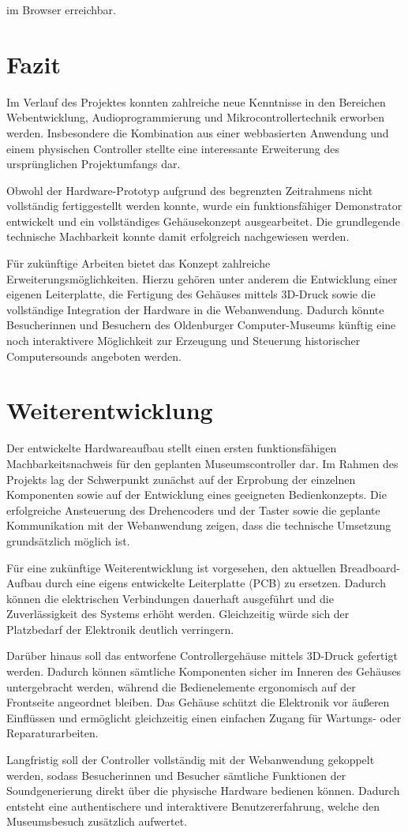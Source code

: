 im Browser erreichbar.

\section{Fazit}

Im Verlauf des Projektes konnten zahlreiche neue Kenntnisse in den Bereichen
Webentwicklung, Audioprogrammierung und Mikrocontrollertechnik erworben werden.
Insbesondere die Kombination aus einer webbasierten Anwendung und einem physischen
Controller stellte eine interessante Erweiterung des ursprünglichen Projektumfangs dar.

Obwohl der Hardware-Prototyp aufgrund des begrenzten Zeitrahmens nicht vollständig
fertiggestellt werden konnte, wurde ein funktionsfähiger Demonstrator entwickelt und ein
vollständiges Gehäusekonzept ausgearbeitet. Die grundlegende technische Machbarkeit
konnte damit erfolgreich nachgewiesen werden.

Für zukünftige Arbeiten bietet das Konzept zahlreiche Erweiterungsmöglichkeiten.
Hierzu gehören unter anderem die Entwicklung einer eigenen Leiterplatte, die Fertigung
des Gehäuses mittels 3D-Druck sowie die vollständige Integration der Hardware in die
Webanwendung. Dadurch könnte Besucherinnen und Besuchern des Oldenburger
Computer-Museums künftig eine noch interaktivere Möglichkeit zur Erzeugung und
Steuerung historischer Computersounds angeboten werden.

\section{Weiterentwicklung}

Der entwickelte Hardwareaufbau stellt einen ersten funktionsfähigen
Machbarkeitsnachweis für den geplanten Museumscontroller dar. Im Rahmen des
Projekts lag der Schwerpunkt zunächst auf der Erprobung der einzelnen Komponenten
sowie auf der Entwicklung eines geeigneten Bedienkonzepts. Die erfolgreiche
Ansteuerung des Drehencoders und der Taster sowie die geplante Kommunikation mit
der Webanwendung zeigen, dass die technische Umsetzung grundsätzlich möglich ist.

Für eine zukünftige Weiterentwicklung ist vorgesehen, den aktuellen Breadboard-Aufbau
durch eine eigens entwickelte Leiterplatte (PCB) zu ersetzen. Dadurch können die
elektrischen Verbindungen dauerhaft ausgeführt und die Zuverlässigkeit des Systems
erhöht werden. Gleichzeitig würde sich der Platzbedarf der Elektronik deutlich
verringern.

Darüber hinaus soll das entworfene Controllergehäuse mittels 3D-Druck gefertigt
werden. Dadurch können sämtliche Komponenten sicher im Inneren des Gehäuses
untergebracht werden, während die Bedienelemente ergonomisch auf der Frontseite
angeordnet bleiben. Das Gehäuse schützt die Elektronik vor äußeren Einflüssen und
ermöglicht gleichzeitig einen einfachen Zugang für Wartungs- oder Reparaturarbeiten.

Langfristig soll der Controller vollständig mit der Webanwendung gekoppelt werden,
sodass Besucherinnen und Besucher sämtliche Funktionen der Soundgenerierung
direkt über die physische Hardware bedienen können. Dadurch entsteht eine
authentischere und interaktivere Benutzererfahrung, welche den Museumsbesuch
zusätzlich aufwertet.